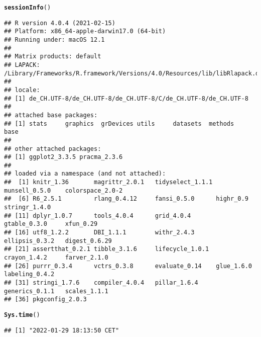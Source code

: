 \documentclass{article}\usepackage[]{graphicx}\usepackage[]{color}
\makeatletter
\newcommand{\hlstd}[1]{\textcolor[rgb]{0.345,0.345,0.345}{#1}}%
\newcommand{\hlkwd}[1]{\textcolor[rgb]{0.737,0.353,0.396}{\textbf{#1}}}%
\newenvironment{kframe}{%
 \def\at@end@of@kframe{}%
 \ifinner\ifhmode%
  \def\at@end@of@kframe{\end{minipage}}%
  \begin{minipage}{\columnwidth}%
 \fi\fi%
 \def\FrameCommand##1{\hskip\@totalleftmargin \hskip-\fboxsep
 \colorbox{shadecolor}{##1}\hskip-\fboxsep
     \hskip-\linewidth \hskip-\@totalleftmargin \hskip\columnwidth}%
 \MakeFramed {\advance\hsize-\width
   \@totalleftmargin\z@ \linewidth\hsize
   \@setminipage}}%
 {\par\unskip\endMakeFramed%
 \at@end@of@kframe}
\newenvironment{knitrout}{}{} %
\makeatother
\begin{document}
\begin{knitrout}
\color{fgcolor}\begin{kframe}
\begin{alltt}
\hlkwd{sessionInfo}\hlstd{()}
\end{alltt}
\begin{verbatim}
## R version 4.0.4 (2021-02-15)
## Platform: x86_64-apple-darwin17.0 (64-bit)
## Running under: macOS 12.1
## 
## Matrix products: default
## LAPACK: /Library/Frameworks/R.framework/Versions/4.0/Resources/lib/libRlapack.dylib
## 
## locale:
## [1] de_CH.UTF-8/de_CH.UTF-8/de_CH.UTF-8/C/de_CH.UTF-8/de_CH.UTF-8
## 
## attached base packages:
## [1] stats     graphics  grDevices utils     datasets  methods   base     
## 
## other attached packages:
## [1] ggplot2_3.3.5 pracma_2.3.6 
## 
## loaded via a namespace (and not attached):
##  [1] knitr_1.36       magrittr_2.0.1   tidyselect_1.1.1 munsell_0.5.0    colorspace_2.0-2
##  [6] R6_2.5.1         rlang_0.4.12     fansi_0.5.0      highr_0.9        stringr_1.4.0   
## [11] dplyr_1.0.7      tools_4.0.4      grid_4.0.4       gtable_0.3.0     xfun_0.29       
## [16] utf8_1.2.2       DBI_1.1.1        withr_2.4.3      ellipsis_0.3.2   digest_0.6.29   
## [21] assertthat_0.2.1 tibble_3.1.6     lifecycle_1.0.1  crayon_1.4.2     farver_2.1.0    
## [26] purrr_0.3.4      vctrs_0.3.8      evaluate_0.14    glue_1.6.0       labeling_0.4.2  
## [31] stringi_1.7.6    compiler_4.0.4   pillar_1.6.4     generics_0.1.1   scales_1.1.1    
## [36] pkgconfig_2.0.3
\end{verbatim}
\begin{alltt}
\hlkwd{Sys.time}\hlstd{()}
\end{alltt}
\begin{verbatim}
## [1] "2022-01-29 18:13:50 CET"
\end{verbatim}
\end{kframe}
\end{knitrout}
\end{document}
